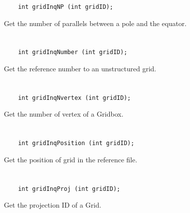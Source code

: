 \begin{verbatim}
    int gridInqNP (int gridID);
\end{verbatim}

Get the number of parallels between a pole and the equator.


\section*{\tt {}}

\begin{verbatim}
    int gridInqNumber (int gridID);
\end{verbatim}

Get the reference number to an unstructured grid.


\section*{\tt {}}

\begin{verbatim}
    int gridInqNvertex (int gridID);
\end{verbatim}

Get the number of vertex of a Gridbox.


\section*{\tt {}}

\begin{verbatim}
    int gridInqPosition (int gridID);
\end{verbatim}

Get the position of grid in the reference file.


\section*{\tt {}}

\begin{verbatim}
    int gridInqProj (int gridID);
\end{verbatim}

Get the projection ID of a Grid.


\section*{\tt {}}

